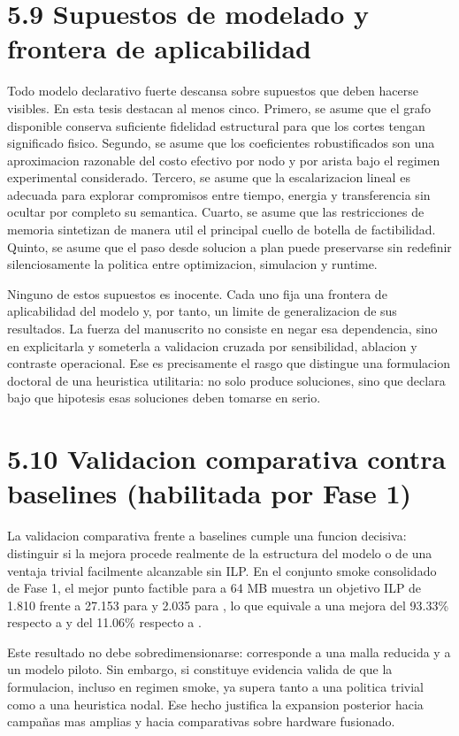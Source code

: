 \section{5.9 Supuestos de modelado y frontera de aplicabilidad}
Todo modelo declarativo fuerte descansa sobre supuestos que deben hacerse visibles. En esta tesis destacan al menos cinco. Primero, se asume que el grafo disponible conserva suficiente fidelidad estructural para que los cortes tengan significado fisico. Segundo, se asume que los coeficientes robustificados son una aproximacion razonable del costo efectivo por nodo y por arista bajo el regimen experimental considerado. Tercero, se asume que la escalarizacion lineal es adecuada para explorar compromisos entre tiempo, energia y transferencia sin ocultar por completo su semantica. Cuarto, se asume que las restricciones de memoria sintetizan de manera util el principal cuello de botella de factibilidad. Quinto, se asume que el paso desde solucion a plan puede preservarse sin redefinir silenciosamente la politica entre optimizacion, simulacion y runtime.

Ninguno de estos supuestos es inocente. Cada uno fija una frontera de aplicabilidad del modelo y, por tanto, un limite de generalizacion de sus resultados. La fuerza del manuscrito no consiste en negar esa dependencia, sino en explicitarla y someterla a validacion cruzada por sensibilidad, ablacion y contraste operacional. Ese es precisamente el rasgo que distingue una formulacion doctoral de una heuristica utilitaria: no solo produce soluciones, sino que declara bajo que hipotesis esas soluciones deben tomarse en serio.

\section{5.10 Validacion comparativa contra baselines (habilitada por Fase 1)}
La validacion comparativa frente a baselines cumple una funcion decisiva: distinguir si la mejora procede realmente de la estructura del modelo o de una ventaja trivial facilmente alcanzable sin ILP. En el conjunto smoke consolidado de Fase 1, el mejor punto factible para  a 64 MB muestra un objetivo ILP de 1.810 frente a 27.153 para  y 2.035 para , lo que equivale a una mejora del 93.33\% respecto a  y del 11.06\% respecto a .

Este resultado no debe sobredimensionarse: corresponde a una malla reducida y a un modelo piloto. Sin embargo, si constituye evidencia valida de que la formulacion, incluso en regimen smoke, ya supera tanto a una politica trivial como a una heuristica nodal. Ese hecho justifica la expansion posterior hacia campañas mas amplias y hacia comparativas sobre hardware fusionado.

